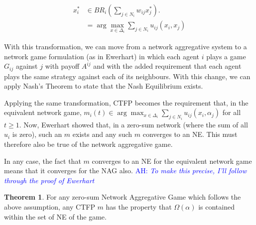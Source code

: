 \documentclass{article}
\theoremstyle{definition}
\newtheorem{theorem}{Theorem}
\newcommand{\ah}[1]{\textcolor{blue}{AH: \textit{#1}}}
\begin{document}
	\begin{align}
			x_i^* & \in BR_i(\sum_{j \in N_i} w_{ij} x_j^*). \\
			& = \arg \max_{x \in \Delta_i} \sum_{j \in N_i} u_{ij}(x_i, x_j) 
	\end{align}
	
	 With this transformation, we can move from a network aggregative system to a network game formulation (as in Ewerhart) in which each agent $i$ plays a game $G_{ij}$ against $j$ with payoff $A^{ij}$ and with the added requirement that each agent plays the same strategy against each of its neighbours. With this change, we can apply Nash's Theorem to state that the Nash Equilibrium exists.
	
	Applying the same transformation, CTFP becomes the requirement that, in the equivalent network game, $m_i(t) \in \arg \max_{x \in \Delta_i} \sum_{j \in N_i} u_{ij}(x_i, \alpha_j)$ for all $t \geq 1$. Now, Ewerhart showed that, in a zero-sum network (where the sum of all $u_i$ is zero), such an $m$ exists and any such $m$ converges to an NE. This must therefore also be true of the network aggregative game.
	
	In any case, the fact that $m$ converges to an NE for the equivalent network game means that it converges for the NAG also. \ah{To make this precise, I'll follow through the proof of Ewerhart}
	
	\begin{theorem}
		For any zero-sum Network Aggregative Game which follows the above assumption, any CTFP $m$ has the property that $\Omega(\alpha)$ is contained within the set of NE of the game.
	\end{theorem}
	
\end{document}
